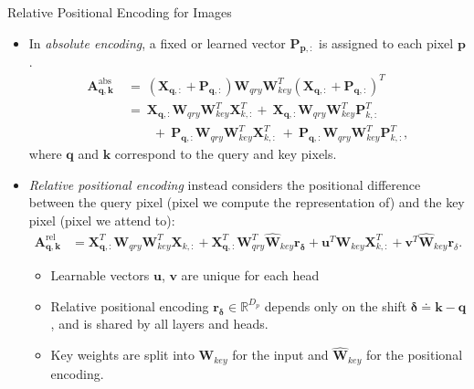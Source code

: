 \documentclass[9pt]{beamer}
\newcommand{\bb}{\mathbb}
\newcommand{\mb}{\bm}
\begin{document}
\newcommand{\WW}{ \mb W_{qry}\mb W_{key}^T }
\begin{frame}{Relative Positional Encoding for Images}
\begin{itemize}
\item In {\em absolute encoding}, a fixed or learned vector $\bm P_{\bm p,:}$ is assigned to each pixel $\bm p$. 
\begin{align}
\mb A^{\text{abs}}_{\mb q, \mb k} 
\ &=\ (\mb X_{\mb q,:} + \mb P_{\mb q,:})\WW(\mb X_{\mb q,:} + \mb P_{\mb q,:})^T \nonumber
\\ &=\ \mb X_{\mb q,:}\WW\mb X^T_{k,:} +\ \mb X_{\mb q,:}\WW\mb P^T_{k,:} 
\\ &\qquad +\ \mb P_{\mb q,:}\WW\mb X^T_{k,:} \ +\ \mb P_{\mb q,:}\WW\mb P^T_{k,:}, \nonumber
\end{align}
where $\bm q$ and $\bm k$ correspond to the query and key pixels.

\vspace{.1in}
\item \emph{Relative positional encoding} instead considers the positional difference between the query pixel (pixel we compute the representation of) and the key pixel (pixel we attend to):
\begin{align}
\mb A^\text{rel}_{\mb q, \mb k} &= 
    \mb X_{\mb q,:}^T \WW \mb X_{k,:}
    + \mb X_{\mb q,:}^T \mb W_{qry}^T\hat{\mb W}_{key} \mb r_{\mb \delta}
    + \mb u^T \mb W_{key} \mb X^T_{k,:}
    + \mb v^T \hat{\mb W}_{key} \mb r_{\delta}.
\end{align}
\vspace{-.15in}
\begin{itemize}
    \item Learnable vectors $\bm u$, $\bm v$ are unique for each head 
    \item Relative positional encoding $\bm r_{\bm \delta} \in \bb R^{D_p}$ depends only on the shift $\bm \delta \doteq \bm k -\bm q$, and is shared by all layers and heads.
    \item Key weights are split into $\bm W_{key}$ for the input and $\hat{\bm W}_{key}$ for the positional encoding.
\end{itemize}

\end{itemize}
\end{frame}
\end{document}
